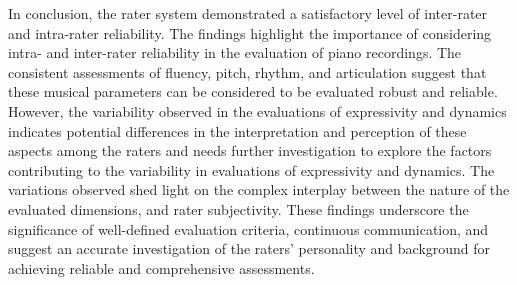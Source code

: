 In conclusion, the rater system demonstrated a satisfactory level of inter-rater and intra-rater reliability. The findings highlight the importance of considering intra- and inter-rater reliability in the evaluation of piano recordings. The consistent assessments of fluency, pitch, rhythm, and articulation suggest that these musical parameters can be considered to be evaluated robust and reliable. However, the variability observed in the evaluations of expressivity and dynamics indicates potential differences in the interpretation and perception of these aspects among the raters and needs further investigation to explore the factors contributing to the variability in evaluations of expressivity and dynamics. The variations observed shed light on the complex interplay between the nature of the evaluated dimensions, and rater subjectivity. 
These findings underscore the significance of well-defined evaluation criteria, continuous communication, and suggest an accurate investigation of the raters' personality and background for achieving reliable and comprehensive assessments.





